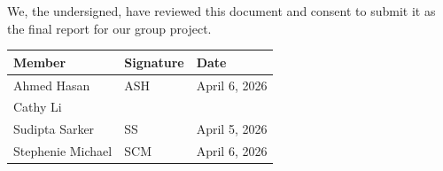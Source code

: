 \documentclass[11pt]{article}
\begin{document}
We, the undersigned, have reviewed this document and consent to submit it as the
final report for our group project.

\begin{table}[H]
\centering
\begin{tabular}{l l l}
\toprule
\textbf{Member} & \textbf{Signature} & \textbf{Date} \\
\midrule
Ahmed Hasan & ASH & April 6, 2026 \\
Cathy Li & & \\
Sudipta Sarker & SS & April 5, 2026 \\
Stephenie Michael & SCM & April 6, 2026 \\
\bottomrule
\end{tabular}
\end{table}
\end{document}
